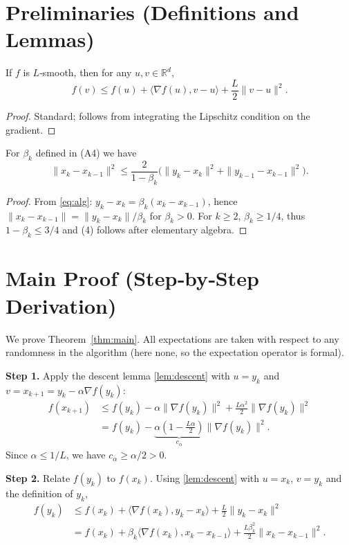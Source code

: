 \documentclass{article}
\begin{document}
\section*{Preliminaries (Definitions and Lemmas)}
\begin{lemma}\label{lem:descent}
If $f$ is $L$‑smooth, then for any $u,v\in\mathbb{R}^d$,
\[
f(v)\le f(u)+\langle\nabla f(u),v-u\rangle+\frac{L}{2}\|v-u\|^2 .
\tag{3}
\]
\end{lemma}
\begin{proof}
Standard; follows from integrating the Lipschitz condition on the gradient. \qedhere
\end{proof}

\begin{lemma}\label{lem:beta}
For $\beta_k$ defined in (A4) we have
\[
\|x_k-x_{k-1}\|^2 \le \frac{2}{1-\beta_k}\bigl(\|y_k-x_k\|^2+\|y_{k-1}-x_{k-1}\|^2\bigr).
\tag{4}
\]
\end{lemma}
\begin{proof}
From \eqref{eq:alg}:
$y_k-x_k = \beta_k (x_k-x_{k-1})$, hence $\|x_k-x_{k-1}\| = \|y_k-x_k\|/\beta_k$ for $\beta_k>0$. For $k\ge2$, $\beta_k\ge 1/4$, thus $1-\beta_k\le 3/4$ and (4) follows after elementary algebra. \qedhere
\end{proof}

\section*{Main Proof (Step‑by‑Step Derivation)}
We prove Theorem~\ref{thm:main}. All expectations are taken with respect to any randomness in the algorithm (here none, so the expectation operator is formal).

\noindent\textbf{Step 1.} Apply the descent lemma \eqref{lem:descent} with $u=y_k$ and $v=x_{k+1}=y_k-\alpha\nabla f(y_k)$:
\begin{align}
f(x_{k+1})
&\le f(y_k)-\alpha\|\nabla f(y_k)\|^2
     +\frac{L\alpha^{2}}{2}\|\nabla f(y_k)\|^{2} \nonumber\\
&= f(y_k)-\underbrace{\alpha\!\left(1-\frac{L\alpha}{2}\right)}_{\displaystyle c_{\alpha}}\|\nabla f(y_k)\|^{2}.
\tag{5}
\end{align}
Since $\alpha\le 1/L$, we have $c_{\alpha}\ge \alpha/2>0$.

\noindent\textbf{Step 2.} Relate $f(y_k)$ to $f(x_k)$. Using \eqref{lem:descent} with $u=x_k$, $v=y_k$ and the definition of $y_k$,
\begin{align}
f(y_k)
&\le f(x_k)+\langle\nabla f(x_k),y_k-x_k\rangle
     +\frac{L}{2}\|y_k-x_k\|^{2} \nonumber\\
&= f(x_k)+\beta_k\langle\nabla f(x_k),x_k-x_{k-1}\rangle
     +\frac{L\beta_k^{2}}{2}\|x_k-x_{k-1}\|^{2}.
\tag{6}
\end{align}
\end{document}
